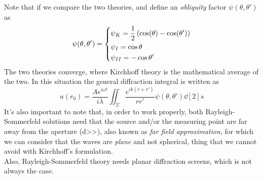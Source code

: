 \documentclass[../electromagnetism.tex]{subfiles}
\begin{document}
Note that if we compare the two theories, and define an \textit{obliquity} factor $\psi(\theta,\theta')$ as
\begin{equation}
	\psi(\theta,\theta')=\begin{dcases}
		\psi_K=\frac{1}{2}\left( \cos(\theta)-\cos(\theta') \right)\\
		\psi_I=\cos\theta\\
		\psi_{II}=-\cos\theta'
	\end{dcases}
	\label{eq:obliquity.diff}
\end{equation}
The two theories converge, where Kirchhoff theory is the mathematical average of the two. In this situation the general diffraction integral is written as
\begin{equation}
	u(r_0)=\frac{Ae^{i\omega t}}{i\lambda}\iint_\Sigma\frac{e^{ik(r+r')}}{rr'}\psi(\theta,\theta')\dd[2]{s}
	\label{eq:diffint-ob.diff}
\end{equation}
It's also important to note that, in order to work properly, both Rayleigh-Sommerfeld solutions need that the source and/or the measuring point are far away from the aperture (d>>\lambda), also known as \textit{far field approximation}, for which we can consider that the waves are \textit{plane} and not spherical, thing that we cannot avoid with Kirchhoff's formulation.\\
Also, Rayleigh-Sommerfeld theory needs planar diffraction screens, which is not always the case.\\
\end{document}
